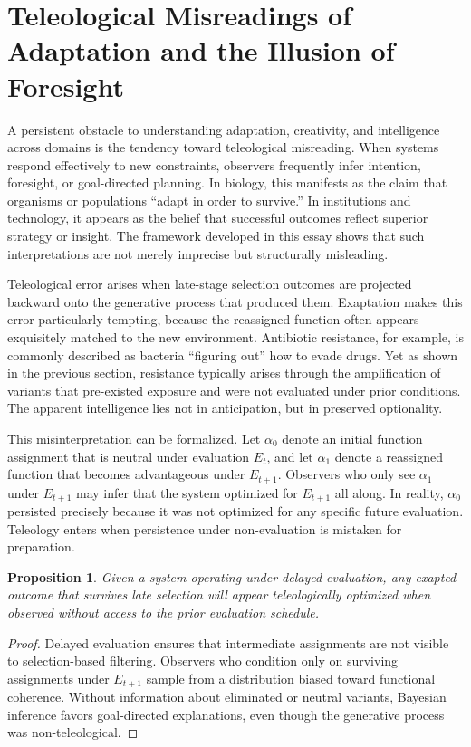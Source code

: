 \documentclass[11pt]{article}
\newtheorem{proposition}{Proposition}
\theoremstyle{definition}
\begin{document}
\section{Teleological Misreadings of Adaptation and the Illusion of Foresight}

A persistent obstacle to understanding adaptation, creativity, and intelligence across domains is the tendency toward teleological misreading. When systems respond effectively to new constraints, observers frequently infer intention, foresight, or goal-directed planning. In biology, this manifests as the claim that organisms or populations ``adapt in order to survive.'' In institutions and technology, it appears as the belief that successful outcomes reflect superior strategy or insight. The framework developed in this essay shows that such interpretations are not merely imprecise but structurally misleading.

Teleological error arises when late-stage selection outcomes are projected backward onto the generative process that produced them. Exaptation makes this error particularly tempting, because the reassigned function often appears exquisitely matched to the new environment. Antibiotic resistance, for example, is commonly described as bacteria ``figuring out'' how to evade drugs. Yet as shown in the previous section, resistance typically arises through the amplification of variants that pre-existed exposure and were not evaluated under prior conditions. The apparent intelligence lies not in anticipation, but in preserved optionality.

This misinterpretation can be formalized. Let $\alpha_0$ denote an initial function assignment that is neutral under evaluation $E_t$, and let $\alpha_1$ denote a reassigned function that becomes advantageous under $E_{t+1}$. Observers who only see $\alpha_1$ under $E_{t+1}$ may infer that the system optimized for $E_{t+1}$ all along. In reality, $\alpha_0$ persisted precisely because it was not optimized for any specific future evaluation. Teleology enters when persistence under non-evaluation is mistaken for preparation.

\begin{proposition}
Given a system operating under delayed evaluation, any exapted outcome that survives late selection will appear teleologically optimized when observed without access to the prior evaluation schedule.
\end{proposition}

\begin{proof}
Delayed evaluation ensures that intermediate assignments are not visible to selection-based filtering. Observers who condition only on surviving assignments under $E_{t+1}$ sample from a distribution biased toward functional coherence. Without information about eliminated or neutral variants, Bayesian inference favors goal-directed explanations, even though the generative process was non-teleological.
\end{proof}
\end{document}
